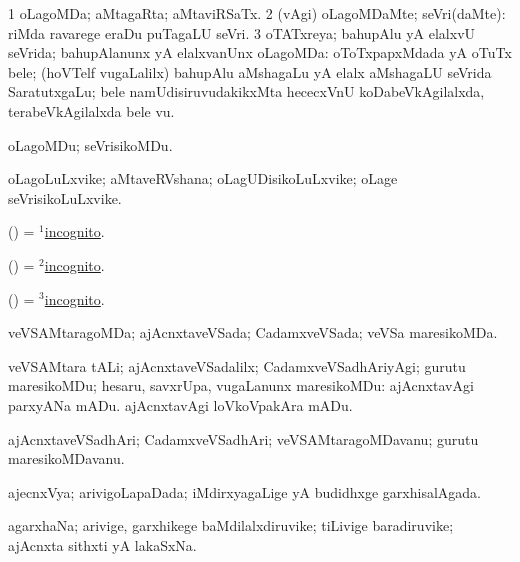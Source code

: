 \bentry
{}
\gl{\gu}
\bmng
\bnum
\num{1} oLagoMDa; aMtagaRta; aMtaviRSaTx. 
\num{2} (\kirxvi vAgi) oLagoMDaMte; seVri(daMte):  riMda ravarege eraDu puTagaLU seVri. 
\num{3} oTATxreya; bahupAlu yA elalxvU seVrida; bahupAlanunx yA elalxvanUnx oLagoMDa:  oToTxpapxMdada yA oTuTx bele; (hoVTelf \mo vugaLalilx) bahupAlu aMshagaLu yA elalx aMshagaLU seVrida SaratutxgaLu; bele namUdisiruvudakikxMta hececxVnU koDabeVkAgilalxda, terabeVkAgilalxda bele \mo vu. 
\enum
\emng
\eentry

\bentry
{}
\gl{\kirxvi}
\bmng
oLagoMDu; seVrisikoMDu. 
\emng
\eentry

\bentry
{}
\gl{\nA}
\bmng
oLagoLuLxvike; aMtaveRVshana; oLagUDisikoLuLxvike; oLage seVrisikoLuLxvike. 
\emng
\eentry

\bentry
{}
\gl{\gu}
\bmng
(\AmA)  = \hyperlink{incognito(1)}{$^1$incognito}. 
\emng
\eentry

\bentry
{}
\gl{\kirxvi}
\bmng
(\AmA)  = \hyperlink{incognito(2)}{$^2$incognito}. 
\emng
\eentry

\bentry
{}
\gl{\nA}
\bmng
(\AmA)  = \hyperlink{incognito(3)}{$^3$incognito}. 
\emng
\eentry

\bentry
{}
\gl{\gu}
\bmng
veVSAMtaragoMDa; ajAcnxtaveVSada; CadamxveVSada; veVSa maresikoMDa. 
\emng
\eentry

\bentry
{}
\gl{\kirxvi}
\bmng
veVSAMtara tALi; ajAcnxtaveVSadalilx; CadamxveVSadhAriyAgi; gurutu maresikoMDu; hesaru, savxrUpa, \mo vugaLanunx maresikoMDu:  ajAcnxtavAgi parxyANa mADu.  ajAcnxtavAgi loVkoVpakAra mADu. 
\emng
\eentry

\bentry
{}
\gl{\nA}
\bmng
ajAcnxtaveVSadhAri; CadamxveVSadhAri; veVSAMtaragoMDavanu; gurutu maresikoMDavanu. 
\emng
\eentry

\bentry
{}
\gl{\gu}
\bmng
ajecnxVya; arivigoLapaDada; iMdirxyagaLige yA budidhxge garxhisalAgada. 
\emng
\eentry

\bentry
{}
\gl{\nA}
\bmng
agarxhaNa; arivige, garxhikege baMdilalxdiruvike; tiLivige baradiruvike; ajAcnxta sithxti yA lakaSxNa. 
\emng
\eentry

